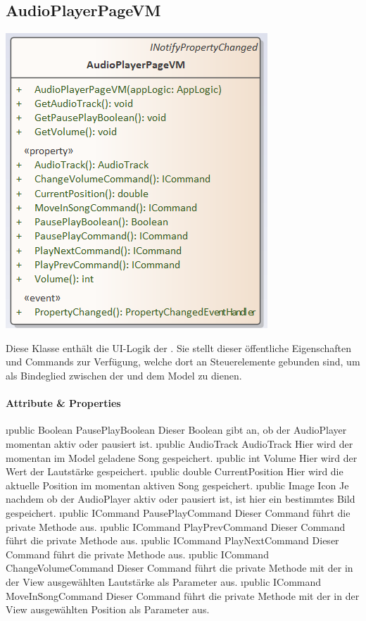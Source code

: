 \documentclass[../entwurf.tex]{subfiles}
\begin{document}
\subsection{AudioPlayerPageVM}
\begin{minipage}{0.55\textwidth}
\includegraphics[scale=0.75]{../graphics/vm_klassen/AudioPlayerPageVM.png}
\end{minipage}
\begin{minipage}{0.45\textwidth}
Diese Klasse enthält die UI-Logik der . Sie stellt dieser öffentliche Eigenschaften und Commands zur Verfügung, welche dort an Steuerelemente gebunden sind, um als Bindeglied zwischen der  und dem Model zu dienen.
\end{minipage}
\paragraph{Attribute \& Properties}
\begin{itemize}
	\i{public Boolean PausePlayBoolean} Dieser Boolean gibt an, ob der AudioPlayer momentan aktiv oder pausiert ist.
	\i{public AudioTrack AudioTrack} Hier wird der momentan im Model geladene Song gespeichert.
	\i{public int Volume} Hier wird der Wert der Lautstärke gespeichert.
	\i{public double CurrentPosition} Hier wird die aktuelle Position im momentan aktiven Song gespeichert.
	\i{public Image Icon} Je nachdem ob der AudioPlayer aktiv oder pausiert ist, ist hier ein bestimmtes Bild gespeichert.
	\i{public ICommand PausePlayCommand} Dieser Command führt die private Methode  aus. 
	\i{public ICommand PlayPrevCommand} Dieser Command führt die private Methode  aus. 
	\i{public ICommand PlayNextCommand} Dieser Command führt die private Methode  aus. 
	\i{public ICommand ChangeVolumeCommand} Dieser Command führt die private Methode  mit der in der View ausgewählten Lautstärke als Parameter aus.
	\i{public ICommand MoveInSongCommand} Dieser Command führt die private Methode  mit der in der View ausgewählten Position als Parameter aus.
\end{itemize}
\end{document}
